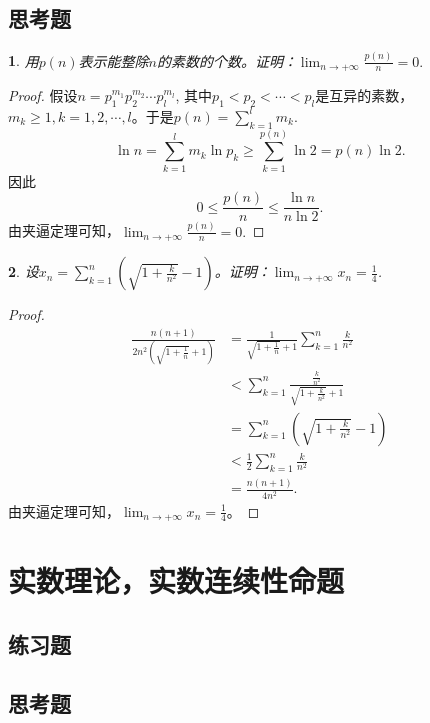 \documentclass[utf8]{book}
\newtheorem{example}{}[section]             %
\begin{document}
\subsection{思考题}
\begin{example}
用$p(n)$表示能整除$n$的素数的个数。证明：$\displaystyle \lim_{n\to +\infty}\frac{p(n)}{n} = 0.$
\end{example}
\begin{proof}
假设$n=p_1^{m_1}p_2^{m_2}\cdots p_l^{m_l}$, 其中$p_1 < p_2 <\cdots < p_l$是互异的素数，$m_k \geq 1, k=1,2,\cdots, l$。于是$p(n)=\displaystyle\sum_{k=1}^{l}m_k$.
$$\ln{n} = \displaystyle\sum_{k=1}^{l}m_k\ln{p_k} \geq \displaystyle\sum_{k=1}^{p(n)}\ln{2}=p(n)\ln{2}.$$
因此
$$0 \leq \frac{p(n)}{n} \leq \frac{\ln{n}}{n\ln{2}}.$$
由夹逼定理可知，$\displaystyle \lim_{n\to +\infty}\frac{p(n)}{n} = 0.$
\end{proof}
\begin{example}
设$x_n = \displaystyle \sum_{k=1}^n\left(\sqrt{1+\frac{k}{n^2}} -1\right)$。证明：$\displaystyle \lim_{n\to +\infty}x_n = \frac{1}{4}$.
\end{example}
\begin{proof}
\begin{equation*}
\begin{split}
\frac{n(n+1)}{2n^2\left(\sqrt{1 +\frac{1}{n}} + 1\right)}&= \frac{1}{\sqrt{1 +\frac{1}{n}} + 1}\displaystyle \sum_{k=1}^n\frac{k}{n^2} \\&< \displaystyle \sum_{k=1}^n\frac{\frac{k}{n^2}}{\sqrt{1+\frac{k}{n^2}}+1} \\&= \displaystyle\sum_{k=1}^n\left(\sqrt{1+\frac{k}{n^2}}-1\right) \\
&< \frac{1}{2}\displaystyle \sum_{k=1}^n\frac{k}{n^2}\\&= \frac{n(n+1)}{4n^2}.
\end{split}
\end{equation*}
由夹逼定理可知，$\displaystyle \lim_{n\to +\infty}x_n = \frac{1}{4}$。
\end{proof}
\section{实数理论，实数连续性命题}
\subsection{练习题}
\subsection{思考题}
\end{document}
